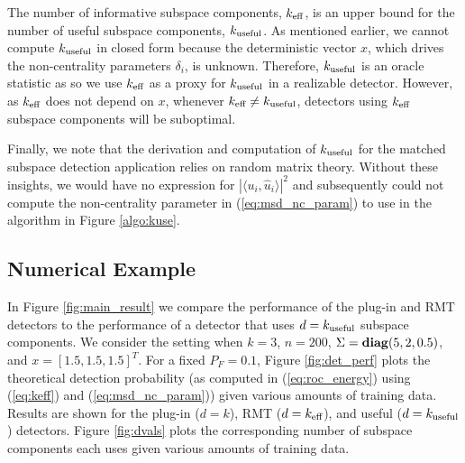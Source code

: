 The number of informative subspace components, $k_\text{eff}$, is an upper bound for the number
of useful subspace components, $k_{\text{useful}}$. As mentioned earlier, we cannot compute $k_{\text{useful}}$ in
closed form because the deterministic vector $x$, which drives the non-centrality
parameters $\delta_i$, is unknown. Therefore, $k_{\text{useful}}$ is an oracle statistic as so we use
$k_\text{eff}$ as a proxy for $k_{\text{useful}}$ in a realizable detector. However, as $k_\text{eff}$ does not depend
on $x$, whenever $k_\text{eff}\neq k_{\text{useful}}$, detectors using $k_\text{eff}$ subspace components will be
suboptimal.

Finally, we note that the derivation and computation of $k_{\text{useful}}$ for the matched subspace
detection application relies on random matrix theory. Without these insights, we would
have no expression for $|\langle u_i,\widehat{u}_i\rangle|^2$ and subsequently could not
compute the non-centrality parameter in (\ref{eq:msd_nc_param}) to use in the algorithm in
Figure \ref{algo:kuse}.

\subsection{Numerical Example}

In Figure \ref{fig:main_result} we compare the performance of the plug-in and RMT
detectors to the performance of a detector that uses $d=k_{\text{useful}}$ subspace components. We
consider the setting when $k=3$, $n=200$, $\Sigma=\mathop{\bf diag}(5,2,0.5)$, and
$x=[1.5,1.5,1.5]^T$. For a fixed $P_F=0.1$, Figure \ref{fig:det_perf} plots the
theoretical detection probability (as computed in (\ref{eq:roc_energy}) using
(\ref{eq:keff}) and (\ref{eq:msd_nc_param})) given various amounts of training
data. Results are shown for the plug-in ($d=k$), RMT ($d=k_\text{eff}$), and useful ($d=k_{\text{useful}}$)
detectors. Figure \ref{fig:dvals} plots the
corresponding number of subspace components each uses given various amounts of training
data.

